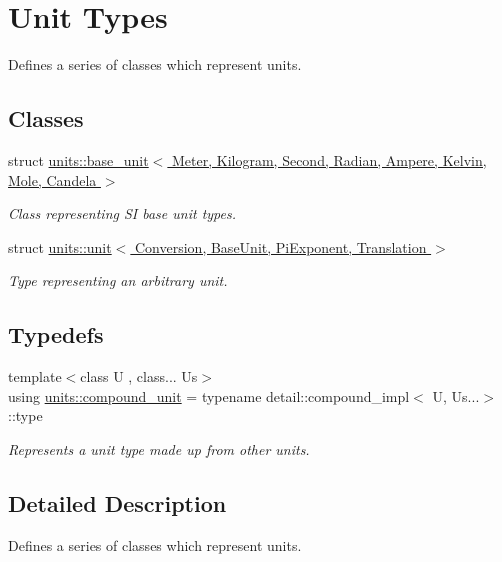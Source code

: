 \hypertarget{group___unit_types}{}\section{Unit Types}
\label{group___unit_types}


Defines a series of classes which represent units.  


\subsection*{Classes}
\begin{DoxyCompactItemize}
\item 
struct \hyperlink{structunits_1_1base__unit}{units\+::base\+\_\+unit$<$ Meter, Kilogram, Second, Radian, Ampere, Kelvin, Mole, Candela $>$}
\begin{DoxyCompactList}\small\item\em Class representing S\+I base unit types. \end{DoxyCompactList}\item 
struct \hyperlink{structunits_1_1unit}{units\+::unit$<$ Conversion, Base\+Unit, Pi\+Exponent, Translation $>$}
\begin{DoxyCompactList}\small\item\em Type representing an arbitrary unit. \end{DoxyCompactList}\end{DoxyCompactItemize}
\subsection*{Typedefs}
\begin{DoxyCompactItemize}
\item 
{\footnotesize template$<$class U , class... Us$>$ }\\using \hyperlink{group___unit_types_ga9c3f6f077dc894620e1ed8358442a8f1}{units\+::compound\+\_\+unit} = typename detail\+::compound\+\_\+impl$<$ U, Us...$>$\+::type
\begin{DoxyCompactList}\small\item\em Represents a unit type made up from other units. \end{DoxyCompactList}\end{DoxyCompactItemize}


\subsection{Detailed Description}
Defines a series of classes which represent units. 

